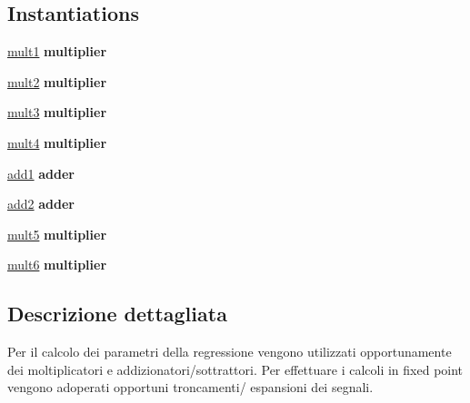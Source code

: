 \subsection*{Instantiations}
 \begin{DoxyCompactItemize}
\item 
\hyperlink{class_linear_regression_1_1_structural_abe2dbada52541335e367815bffe06c28}{mult1}  {\bfseries multiplier}   
\item 
\hyperlink{class_linear_regression_1_1_structural_a7c5c7b6fb03b66e49b0eb767162f01a8}{mult2}  {\bfseries multiplier}   
\item 
\hyperlink{class_linear_regression_1_1_structural_adf80c8ef67f9eb716830cfb9a6d3a980}{mult3}  {\bfseries multiplier}   
\item 
\hyperlink{class_linear_regression_1_1_structural_a65ae62ab3b1e6675bf4e4bcf572d2025}{mult4}  {\bfseries multiplier}   
\item 
\hyperlink{class_linear_regression_1_1_structural_adea88291834bfbc1cfe284774c792d37}{add1}  {\bfseries adder}   
\item 
\hyperlink{class_linear_regression_1_1_structural_a09e3b860880a85f376374594ffd092fb}{add2}  {\bfseries adder}   
\item 
\hyperlink{class_linear_regression_1_1_structural_aed551c15ed15fe4ab7d0c073a7e33b9c}{mult5}  {\bfseries multiplier}   
\item 
\hyperlink{class_linear_regression_1_1_structural_afa25d32bbc0881baaa179e393e1964c5}{mult6}  {\bfseries multiplier}   
\end{DoxyCompactItemize}


\subsection{Descrizione dettagliata}
Per il calcolo dei parametri della regressione vengono utilizzati opportunamente dei moltiplicatori e addizionatori/sottrattori. Per effettuare i calcoli in fixed point vengono adoperati opportuni troncamenti/ espansioni dei segnali. 

